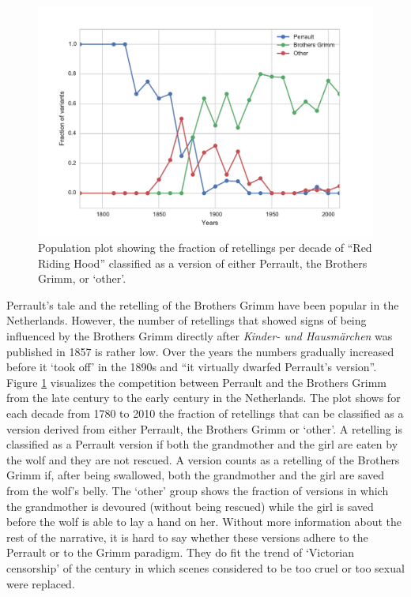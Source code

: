 \begin{figure}[t]
    \centering
    \includegraphics[width=\textwidth]{images/battle}
    \caption{Population plot showing the fraction of retellings per decade of ``Red Riding Hood'' classified as a version of either Perrault, the Brothers Grimm, or `other'.}
    \label{fig:battle}
\end{figure}

Perrault's tale and the retelling of the Brothers Grimm have been popular in the Netherlands. However, the number of retellings that showed signs of being influenced by the Brothers Grimm directly after \emph{Kinder- und Hausmärchen} was published in 1857 is rather low. Over the years the numbers gradually increased before it `took off' in the 1890s and ``it virtually dwarfed Perrault's version''\autocite[36]{zipes:1993}. Figure \ref{fig:battle} visualizes the competition between Perrault and the Brothers Grimm from the late  century to the early  century in the Netherlands. The plot shows for each decade from 1780 to 2010 the fraction of retellings that can be classified as a version derived from either Perrault, the Brothers Grimm or `other'. A retelling is classified as a Perrault version if both the grandmother and the girl are eaten by the wolf and they are not rescued. A version counts as a retelling of the Brothers Grimm if, after being swallowed, both the grandmother and the girl are saved from the wolf's belly. The `other' group shows the fraction of versions in which the grandmother is devoured (without being rescued) while the girl is saved before the wolf is able to lay a hand on her. Without more information about the rest of the narrative, it is hard to say whether these versions adhere to the Perrault or to the Grimm paradigm. They do fit the trend of `Victorian censorship' of the  century in which scenes considered to be too cruel or too sexual were replaced. 

